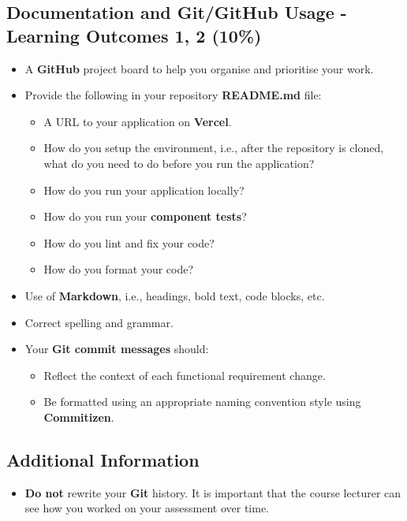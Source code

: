\documentclass{article}
\begin{document}
\subsection*{Documentation and Git/GitHub Usage - Learning Outcomes 1, 2 (10\%)}
\begin{itemize}
	\item A \textbf{GitHub} project board to help you organise and prioritise your work. 
	\item Provide the following in your repository \textbf{README.md} file:
	\begin{itemize}
		\item A URL to your application on \textbf{Vercel}.
		\item How do you setup the environment, i.e., after the repository is cloned, what do you need to do before you run the application?
		\item How do you run your application locally?
		\item How do you run your \textbf{component tests}?
		\item How do you lint and fix your code?
		\item How do you format your code?
	\end{itemize}
	\item Use of \textbf{Markdown}, i.e., headings, bold text, code blocks, etc.
	\item Correct spelling and grammar. 
	\item Your \textbf{Git commit messages} should:
	\begin{itemize}
		\item Reflect the context of each functional requirement change.
		\item Be formatted using an appropriate naming convention style using \textbf{Commitizen}.
	\end{itemize}	
\end{itemize}

\subsection*{Additional Information}
\begin{itemize}
	\item \textbf{Do not} rewrite your \textbf{Git} history. It is important that the course lecturer can see how you worked on your assessment over time.
\end{itemize}
\end{document}
